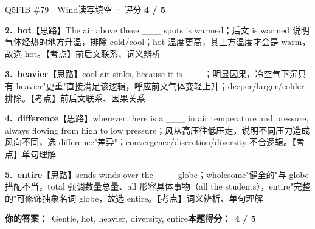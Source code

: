 \begin{qblock}{Q5\quad FIB \#79\ \ Wind}{读写填空 · 评分 \textcolor{cAccent}{\bfseries 4 / 5}}
\begin{notebox}
\textbf{2.\ hot}\quad【思路】The air above these \_\_\_ spots is warmed；后文 is warmed 说明气体经热的地方升温，排除 cold/cool；hot 温度更高，其上方温度才会是 warm，故选 hot。【考点】前后文联系、词义辨析\par\smallskip
\textbf{3.\ heavier}\quad【思路】cool air sinks, because it is \_\_\_；明显因果，冷空气下沉只有 heavier"更重"直接满足该逻辑，呼应前文气体变轻上升；deeper/larger/colder 排除。【考点】前后文联系、因果关系\par\smallskip
\textbf{4.\ difference}\quad【思路】wherever there is a \_\_\_ in air temperature and pressure, always flowing from high to low pressure；风从高压往低压走，说明不同压力造成风向不同，选 difference"差异"；convergence/discretion/diversity 不合逻辑。【考点】单句理解\par\smallskip
\textbf{5.\ entire}\quad【思路】sends winds over the \_\_\_ globe；wholesome"健全的"与 globe 搭配不当，total 强调数量总量、all 形容具体事物（all the students），entire"完整的"可修饰抽象名词 globe，故选 entire。【考点】词义辨析、单句理解
\end{notebox}
\smallskip
\textbf{你的答案：}\ Gentle, hot, heavier, {\color{cWrong}diversity}, entire\qquad\textbf{本题得分：}\ {\color{cAccent}\bfseries 4 / 5}
\end{qblock}

